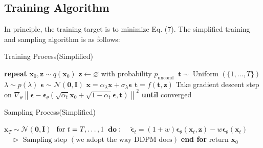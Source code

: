 \documentclass{article}
\begin{document}
\subsection{Training Algorithm}
In principle, the training target is to minimize Eq. (7). The simplified training and sampling algorithm is as follows:
\begin{algorithm}
    \caption{Training Process(Simplified)}
    \begin{algorithmic}
        \STATE \textbf{repeat}
        \STATE \hspace{0.5cm}$\mathbf{x}_{0}, \mathbf{z} \sim q\left(\mathbf{x}_{0}\right)$
        \STATE \hspace{0.5cm}$\mathbf{z} \leftarrow \varnothing$ with probability $p_{\text {uncond }}$
        \STATE \hspace{0.5cm}$\mathbf{t} \sim \operatorname{Uniform}(\{1, \ldots, T\})$
        \STATE \hspace{0.5cm}$\lambda \sim p(\lambda)$
        \STATE \hspace{0.5cm}$\boldsymbol{\epsilon} \sim \mathcal{N}(\mathbf{0}, \mathbf{I})$ \STATE \hspace{0.5cm}$\mathbf{x}=\alpha_{\lambda} \mathbf{x}+\sigma_{\lambda} \boldsymbol{\epsilon}$
        \STATE \hspace{0.5cm}$\mathbf{t} = f(\mathbf{t}, \mathbf{z})$
        \STATE \hspace{0.5cm}Take gradient descent step on
        \STATE \hspace{1cm} $\nabla_{\theta}\left\|\boldsymbol{\epsilon}-\boldsymbol{\epsilon}_{\theta}\left(\sqrt{\bar{\alpha}_{t}} \mathbf{x}_{0}+\sqrt{1-\bar{\alpha}_{t}} \boldsymbol{\epsilon}, \mathbf{t}\right)\right\|^{2}$
        \STATE \textbf{until} converged
    \end{algorithmic}
\end{algorithm}
\begin{algorithm}
    \caption{Sampling Process(Simplified)}
    \begin{algorithmic}
        \STATE $\mathbf{x}_{T} \sim \mathcal{N}(\mathbf{0}, \mathbf{I})$
        \STATE $\text { for } t = T, \ldots, 1 \hspace{2mm} \mathbf{do:} $
        \STATE \hspace{0.5cm}$\quad \tilde{\boldsymbol{\epsilon}}_{t}=(1+w) \boldsymbol{\epsilon}_{\theta}\left(\mathbf{x}_{t}, \mathbf{z}\right)-w \boldsymbol{\epsilon}_{\theta}\left(\mathbf{x}_{t}\right)$
        \STATE \hspace{0.5cm}$\quad \triangleright \text { Sampling step }(\text {we adopt the way DDPM does})$
        \STATE \textbf{end for }
        \STATE return $\mathbf{x}_{0}$
    \end{algorithmic}
\end{algorithm}
\end{document}

